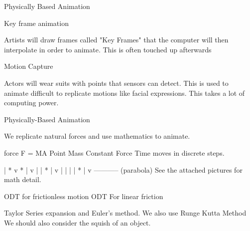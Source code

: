 Physically Based Animation

Key frame animation

Artists will draw frames called "Key Frames" that
the computer will then interpolate in order to animate.
This is often touched up afterwards

Motion Capture

Actors will wear suits with points that sensors can detect.
This is used to animate difficult to replicate motions like
facial expressions. This takes a lot of computing power.

Physically-Based Animation

We replicate natural forces and use mathematics to animate.

force
F = MA
Point Mass
Constant Force
Time moves in discrete steps.

|
*
v *
| v
|
|   *
|   v
|
|
|
|     *
|     v
-----------
(parabola)
See the attached pictures for math detail.

ODT for frictionless motion
ODT For linear friction

Taylor Series expansion and Euler's method.
We also use Runge Kutta Method
We should also consider the squish of an object.
